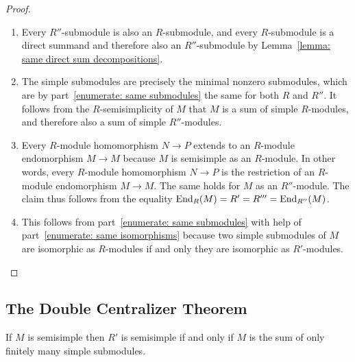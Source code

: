 \begin{proof}
  \leavevmode
  \begin{enumerate}
    \item
      Every $R''$-submodule is also an $R$-submodule, and every $R$-submodule is a direct summand and therefore also an $R''$-submodule by Lemma~\ref{lemma: same direct sum decompositions}.
    \item
      The simple submodules are precisely the minimal nonzero submodules, which are by part~\ref*{enumerate: same submodules} the same for both $R$ and $R''$.
      It follows from the $R$-semisimplicity of $M$ that $M$ is a sum of simple $R$-modules, and therefore also a sum of simple $R''$-modules.
    \item
      Every $R$-module homomorphism $N \to P$ extends to an $R$-module endomorphism $M \to M$ because $M$ is semisimple as an $R$-module.
      In other words, every $R$-module homomorphism $N \to P$ is the restriction of an $R$-module endomorphism $M \to M$.
      The same holds for $M$ as an $R''$-module.
      The claim thus follows from the equality $\operatorname{End}_R(M) = R' = R''' = \operatorname{End}_{R''}(M)$.
    \item
      This follows from part~\ref*{enumerate: same submodules} with help of part~\ref*{enumerate: same isomorphisms} because two simple submodules of $M$ are isomorphic as $R$-modules if and only they are isomorphic as $R'$-modules.
    \qedhere
  \end{enumerate}
\end{proof}





\subsection{The Double Centralizer Theorem}


\begin{proposition}
  \label{proposition: when R' is semisimple}
  If $M$ is semisimple then $R'$ is semisimple if and only if $M$ is the sum of only finitely many simple submodules.
\end{proposition}


